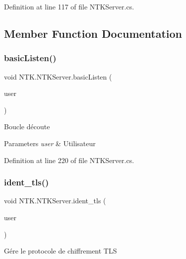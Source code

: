 Definition at line 117 of file N\+T\+K\+Server.\+cs.



\subsection{Member Function Documentation}
\mbox{\label{class_n_t_k_1_1_n_t_k_server_a916c59bcf5c272de1b7fa35c77de9ce2}} 
\subsubsection{\texorpdfstring{basicListen()}{basicListen()}}
{\footnotesize\ttfamily void N\+T\+K.\+N\+T\+K\+Server.\+basic\+Listen (\begin{DoxyParamCaption}\item[{\mbox{\hyperlink{class_n_t_k_1_1_n_t_k_user}{N\+T\+K\+User}}}]{user }\end{DoxyParamCaption})}



Boucle d\textquotesingle{}écoute 


\begin{DoxyParams}{Parameters}
{\em user} & Utilisateur\\
\hline
\end{DoxyParams}


Definition at line 220 of file N\+T\+K\+Server.\+cs.

\mbox{\label{class_n_t_k_1_1_n_t_k_server_a6795dea242e466797582ba362fcbe63f}} 
\subsubsection{\texorpdfstring{ident\_tls()}{ident\_tls()}}
{\footnotesize\ttfamily void N\+T\+K.\+N\+T\+K\+Server.\+ident\+\_\+tls (\begin{DoxyParamCaption}\item[{\mbox{\hyperlink{class_n_t_k_1_1_n_t_k_user}{N\+T\+K\+User}}}]{user }\end{DoxyParamCaption})}



Gére le protocole de chiffrement T\+LS 


